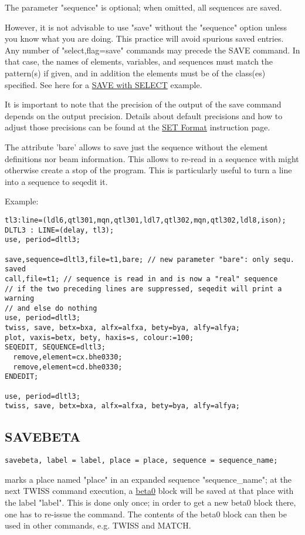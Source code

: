 The parameter "sequence" is optional; when omitted, all sequences are
saved.  

However, it is not advisable to use "save" without the "sequence" option
unless you know what you are doing. This practice will avoid spurious
saved entries.    Any number of "select,flag=save" commands may precede
the SAVE command. In that case, the names of elements, variables, and
sequences must match the pattern(s) if given, and in addition the
elements must be of the class(es) specified. See here for a
\href{../Introduction/select.html#save_select}{SAVE with SELECT}
example.  

It is important to note that the precision of the output of the save
command depends on the output precision. Details about default
precisions and how to adjust those precisions can be found at the
\href{../Introduction/set.html#Format}{SET Format} instruction page.   
 
The attribute 'bare' allows to save just the sequence without the
element definitions nor beam information. This allows to re-read in a
sequence with might otherwise create a stop of the program. This is
particularly useful to turn a line into a sequence to seqedit
it. 

Example:  
\begin{verbatim}
tl3:line=(ldl6,qtl301,mqn,qtl301,ldl7,qtl302,mqn,qtl302,ldl8,ison);
DLTL3 : LINE=(delay, tl3);
use, period=dltl3;

save,sequence=dltl3,file=t1,bare; // new parameter "bare": only sequ. saved
call,file=t1; // sequence is read in and is now a "real" sequence
// if the two preceding lines are suppressed, seqedit will print a warning
// and else do nothing
use, period=dltl3;
twiss, save, betx=bxa, alfx=alfxa, bety=bya, alfy=alfya;
plot, vaxis=betx, bety, haxis=s, colour:=100;
SEQEDIT, SEQUENCE=dltl3;
  remove,element=cx.bhe0330;
  remove,element=cd.bhe0330;
ENDEDIT;

use, period=dltl3;
twiss, save, betx=bxa, alfx=alfxa, bety=bya, alfy=alfya;
\end{verbatim}


\subsection{SAVEBETA}
\label{subsec:general_savebeta}
\begin{verbatim}
savebeta, label = label, place = place, sequence = sequence_name;
\end{verbatim} 
marks a place named "place" in an expanded sequence "sequence\_name"; 
at the next TWISS command execution, a
\href{../twiss/twiss.html#beta0}{beta0} 
block will be saved at that place with the label "label". This is done
only once; in order to get a new beta0 block there, one has to re-issue
the command. The contents of the beta0 block can then be used in other
commands, e.g. TWISS and MATCH.  

